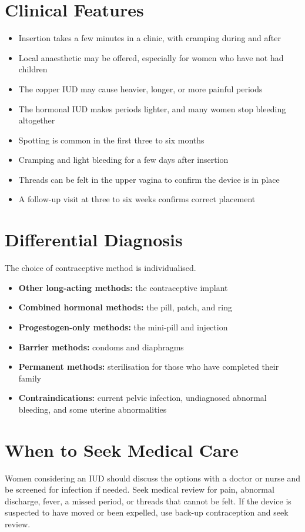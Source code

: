 \section*{Clinical Features}
\begin{itemize}
    \item Insertion takes a few minutes in a clinic, with cramping during and after
    \item Local anaesthetic may be offered, especially for women who have not had children
    \item The copper IUD may cause heavier, longer, or more painful periods
    \item The hormonal IUD makes periods lighter, and many women stop bleeding altogether
    \item Spotting is common in the first three to six months
    \item Cramping and light bleeding for a few days after insertion
    \item Threads can be felt in the upper vagina to confirm the device is in place
    \item A follow-up visit at three to six weeks confirms correct placement
\end{itemize}

\section*{Differential Diagnosis}
The choice of contraceptive method is individualised.
\begin{itemize}
    \item \textbf{Other long-acting methods:} the contraceptive implant
    \item \textbf{Combined hormonal methods:} the pill, patch, and ring
    \item \textbf{Progestogen-only methods:} the mini-pill and injection
    \item \textbf{Barrier methods:} condoms and diaphragms
    \item \textbf{Permanent methods:} sterilisation for those who have completed their family
    \item \textbf{Contraindications:} current pelvic infection, undiagnosed abnormal bleeding, and some uterine abnormalities
\end{itemize}

\section*{When to Seek Medical Care}
Women considering an IUD should discuss the options with a doctor or nurse and be screened for infection if needed. Seek medical review for pain, abnormal discharge, fever, a missed period, or threads that cannot be felt. If the device is suspected to have moved or been expelled, use back-up contraception and seek review.

